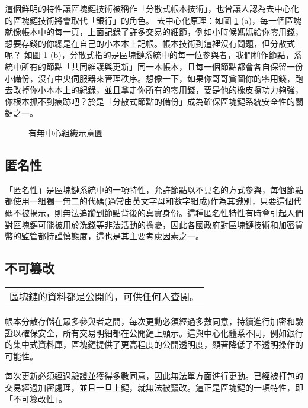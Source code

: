 這個鮮明的特性讓區塊鏈技術被稱作「分散式帳本技術」，也曾讓人認為去中心化的區塊鏈技術將會取代「銀行」的角色。
去中心化原理：如圖 \ref{fig:central} (a)，每一個區塊就像帳本中的每一頁，上面記錄了許多交易的細節，例如小時候媽媽給你零用錢，想要存錢的你總是在自己的小本本上記帳。帳本技術到這裡沒有問題，但分散式呢？
如圖 \ref{fig:central} (b)，分散式指的是區塊鏈系統中的每一位參與者，我們稱作節點，系統中所有的節點「共同維護與更新」同一本帳本，且每一個節點都會各自保留一份小備份，沒有中央伺服器來管理秩序。想像一下，如果你哥哥貪圖你的零用錢，跑去改掉你小本本上的紀錄，並且拿走你所有的零用錢，要是他的橡皮擦功力夠強，你根本抓不到痕跡吧？於是「分散式節點的備份」成為確保區塊鏈系統安全性的關鍵之一。
\begin{figure}[h]
    \centering
    \caption{有無中心組織示意圖}
    \label{fig:central}
\end{figure}
\subsection{\SM 匿名性}
「匿名性」是區塊鏈系統中的一項特性，允許節點以不具名的方式參與，每個節點都使用一組獨一無二的代碼(通常由英文字母和數字組成)作為其識別，只要這個代碼不被揭示，則無法追蹤到節點背後的真實身份。這種匿名性特性有時會引起人們對區塊鏈可能被用於洗錢等非法活動的擔憂，因此各國政府對區塊鏈技術和加密貨幣的監管都持謹慎態度，這也是其主要考慮因素之一。
\subsection{\PP 不可篡改}
\bigskip     %
\begin{center}\colorbox{bubbles}{\begin{tabular}{p{}}
	 {區塊鏈的資料都是公開的，可供任何人查閱。	}
\end{tabular}}
\end{center}
\bigskip	
帳本分散存儲在眾多參與者之間，每次更動必須經過多數同意，持續進行加密和驗證以確保安全，所有交易明細都在公開鏈上顯示。這與中心化體系不同，例如銀行的集中式資料庫，區塊鏈提供了更高程度的公開透明度，顯著降低了不透明操作的可能性。

每次更新必須經過驗證並獲得多數同意，因此無法單方面進行更動。已經被打包的交易經過加密處理，並且一旦上鏈，就無法被竄改。這正是區塊鏈的一項特性，即「不可篡改性」。

